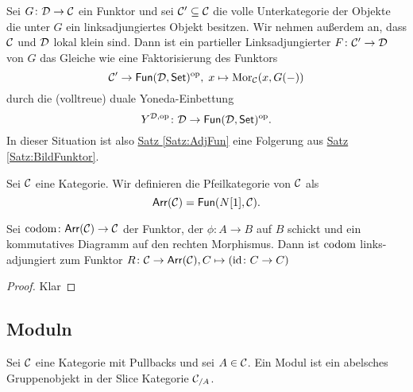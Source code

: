 \begin{Bem}
     Sei $G\colon \mathcal{D}\to \mathcal{C}$ ein Funktor und sei $\mathcal{C}'\subseteq \mathcal{C}$ die volle Unterkategorie der
 Objekte die unter $G$ ein linksadjungiertes Objekt besitzen. Wir nehmen außerdem an, dass $\mathcal{C}$
 und $\mathcal{D}$ lokal klein sind.
 Dann ist ein partieller Linksadjungierter $F\colon\mathcal{C}'\to \mathcal{D}$ von $G$ das Gleiche wie eine Faktorisierung des Funktors
 $$\mathcal{C}'\to\mathsf{Fun}(\mathcal{D},\mathsf{Set})^{\mathrm{op}},\; x\mapsto\operatorname{Mor}_{\mathcal{C}}(x,G(-))$$
 durch die (volltreue) duale Yoneda-Einbettung $$Y^{\mathcal{D},\mathrm{op}}\colon \mathcal{D}\to\mathsf{Fun}(\mathcal{D},\mathsf{Set})^{\mathrm{op}}.$$ In dieser Situation
 ist also \hyperref[Satz:AdjFun]{Satz \ref{Satz:AdjFun}} eine Folgerung aus \hyperref[Satz:BildFunktor]{Satz \ref{Satz:BildFunktor}}.
\end{Bem}
\begin{Def}\label{Def:ArrowCat}
    Sei $\mathcal{C}$ eine Kategorie. Wir definieren die Pfeilkategorie von $\mathcal{C}$ als $$\mathsf{Arr}(\mathcal{C})=\mathsf{Fun}(N[1],\mathcal{C}).$$
\end{Def}
\begin{Lemma}\label{Lem:CodomAdj}
    Sei $\operatorname{codom}\colon \mathsf{Arr}(\mathcal{C})\to \mathcal{C}$ der Funktor, der $\phi\colon A\to B$ auf $B$ schickt und ein kommutatives Diagramm auf den rechten Morphismus.
    Dann ist $\operatorname{codom}$ links-adjungiert zum Funktor $R\colon \mathcal{C}\to \mathsf{Arr}(\mathcal{C}), C\mapsto (\mathrm{id}\colon C\to C)$
\end{Lemma}
\begin{proof}
    Klar
\end{proof}
\subsection{Moduln}
\begin{Def}
    Sei $\mathcal{C}$ eine Kategorie mit Pullbacks und sei $A\in\mathcal{C}$. Ein Modul ist ein abelsches Gruppenobjekt in der Slice Kategorie $\mathcal{C}_{/A}$.
\end{Def}